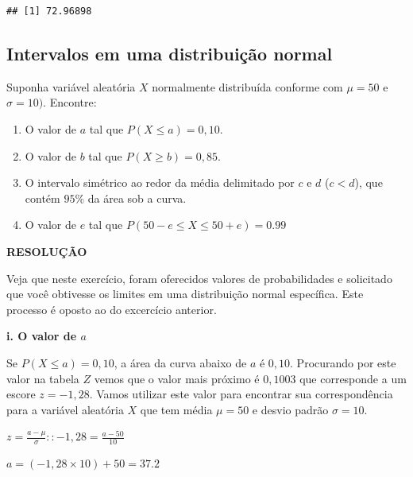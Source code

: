 \documentclass[
]{book}
\providecommand{\tightlist}{%
  \setlength{\itemsep}{0pt}\setlength{\parskip}{0pt}}
\begin{document}
\begin{verbatim}
## [1] 72.96898
\end{verbatim}

\hypertarget{intervalos-em-uma-distribuiuxe7uxe3o-normal}{%
\subsection{Intervalos em uma distribuição normal}\label{intervalos-em-uma-distribuiuxe7uxe3o-normal}}

Suponha variável aleatória \(X\) normalmente distribuída conforme com \(\mu = 50\) e \(\sigma = 10)\). Encontre:

\begin{enumerate}
\def\labelenumi{\roman{enumi}.}
\tightlist
\item
  O valor de \(a\) tal que \(P(X \le a) = 0,10\).
\item
  O valor de \(b\) tal que \(P(X \ge b) = 0,85\).
\item
  O intervalo simétrico ao redor da média delimitado por \(c\) e \(d\) (\(c < d\)), que contém \(95\%\) da área sob a curva.
\item
  O valor de \(e\) tal que \(P(50-e \le X \le 50+e) = 0.99\)
\end{enumerate}

\textbf{RESOLUÇÃO}

Veja que neste exercício, foram oferecidos valores de probabilidades e solicitado que você obtivesse os limites em uma distribuição normal específica. Este processo é oposto ao do excercício anterior.

\textbf{i. O valor de \(a\)}

Se \(P(X \le a) = 0,10\), a área da curva abaixo de \(a\) é \(0,10\). Procurando por este valor na tabela \(Z\) vemos que o valor mais próximo é \(0,1003\) que corresponde a um escore \(z = -1,28\). Vamos utilizar este valor para encontrar sua correspondência para a variável aleatória \(X\) que tem média \(\mu = 50\) e desvio padrão \(\sigma = 10\).

\(z = \frac{a - \mu}{\sigma} :: -1,28 = \frac{a - 50}{10}\)

\(a = (-1,28 \times 10) + 50 = 37.2\)
\end{document}
